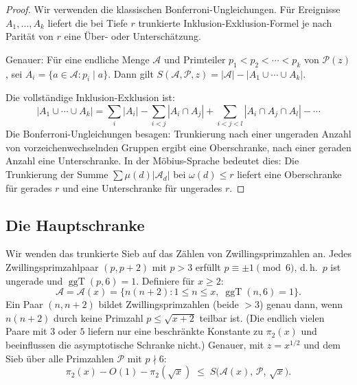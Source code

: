 \documentclass[12pt,a4paper]{amsart}
\theoremstyle{definition}
\DeclareMathOperator{\ggT}{ggT}
\begin{document}
\begin{proof}
  Wir verwenden die klassischen Bonferroni-Ungleichungen.  Für Ereignisse
  $A_1, \ldots, A_k$ liefert die bei Tiefe $r$ trunkierte
  Inklusion-Exklusion-Formel je nach Parität von $r$ eine Über- oder
  Unterschätzung.

  Genauer: Für eine endliche Menge $\mathcal{A}$ und Primteiler
  $p_1 < p_2 < \cdots < p_k$ von $\mathcal{P}(z)$, sei
  $A_i = \{a \in \mathcal{A} : p_i \mid a\}$.  Dann gilt
  $S(\mathcal{A}, \mathcal{P}, z) = |\mathcal{A}| - |A_1 \cup \cdots \cup A_k|$.

  Die vollständige Inklusion-Exklusion ist:
  \[
    |A_1 \cup \cdots \cup A_k|
    = \sum_i |A_i| - \sum_{i<j} |A_i \cap A_j| + \sum_{i<j<l} |A_i \cap A_j \cap A_l| - \cdots
  \]
  Die Bonferroni-Ungleichungen besagen: Trunkierung nach einer ungeraden
  Anzahl von vorzeichenwechselnden Gruppen ergibt eine Oberschranke,
  nach einer geraden Anzahl eine Unterschranke.  In der Möbius-Sprache bedeutet dies:
  Die Trunkierung der Summe $\sum \mu(d) |\mathcal{A}_d|$ bei $\omega(d) \leq r$
  liefert eine Oberschranke für gerades $r$ und eine Unterschranke für ungerades $r$.
\end{proof}

\subsection{Die Hauptschranke}

Wir wenden das trunkierte Sieb auf das Zählen von Zwillingsprimzahlen an.
Jedes Zwillingsprimzahlpaar $(p, p+2)$ mit $p > 3$ erfüllt $p \equiv \pm 1 \pmod 6$,
d.\,h.\ $p$ ist ungerade und $\ggT(p, 6) = 1$.  Definiere für $x \geq 2$:
\[
  \mathcal{A} = \mathcal{A}(x)
  = \bigl\{n(n+2) : 1 \leq n \leq x,\; \ggT(n, 6) = 1\bigr\}.
\]
Ein Paar $(n, n+2)$ bildet Zwillingsprimzahlen (beide $> 3$) genau dann, wenn
$n(n+2)$ durch keine Primzahl $p \leq \sqrt{x+2}$ teilbar ist.
(Die endlich vielen Paare mit $3$ oder $5$ liefern nur eine beschränkte Konstante
zu $\pi_2(x)$ und beeinflussen die asymptotische Schranke nicht.)
Genauer, mit $z = x^{1/2}$ und dem Sieb über alle Primzahlen $\mathcal{P}$
mit $p \nmid 6$:
\[
  \pi_2(x) - O(1) - \pi_2(\sqrt{x})
  \;\leq\;
  S\!\bigl(\mathcal{A}(x),\, \mathcal{P},\, \sqrt{x}\bigr).
\]
\end{document}
